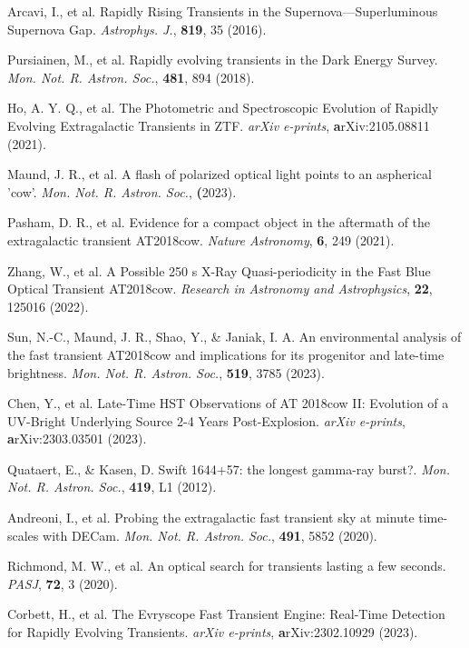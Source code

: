 \documentclass{nature_plusfigure}
\newcommand{\mn}{{Mon. Not. R. Astron. Soc.}}
\newcommand{\mnras}{\mn}
\newcommand{\apj}{{Astrophys. J.}}
\newcommand{\pasj}{{PASJ}}
\begin{document}
\begin{thebibliography}{100}
 Arcavi, I., et al. Rapidly Rising Transients in the Supernova—Superluminous Supernova Gap. \emph{\apj}, \textbf{819}, 35 (2016). 

 Pursiainen, M., et al. Rapidly evolving transients in the Dark Energy Survey. \emph{\mnras}, \textbf{481}, 894 (2018). 

 Ho, A. Y. Q., et al. The Photometric and Spectroscopic Evolution of Rapidly Evolving Extragalactic Transients in ZTF. \emph{arXiv e-prints}, \textbf arXiv:2105.08811 (2021). 

 Maund, J. R., et al. A flash of polarized optical light points to an aspherical 'cow'. \emph{\mnras}, \textbf (2023). 

 Pasham, D. R., et al. Evidence for a compact object in the aftermath of the extragalactic transient AT2018cow. \emph{Nature Astronomy}, \textbf{6}, 249 (2021). 

 Zhang, W., et al. A Possible 250 s X-Ray Quasi-periodicity in the Fast Blue Optical Transient AT2018cow. \emph{Research in Astronomy and Astrophysics}, \textbf{22}, 125016 (2022). 

 Sun, N.-C., Maund, J. R., Shao, Y., \& Janiak, I. A. An environmental analysis of the fast transient AT2018cow and implications for its progenitor and late-time brightness. \emph{\mnras}, \textbf{519}, 3785 (2023). 

 Chen, Y., et al. Late-Time HST Observations of AT 2018cow II: Evolution of a UV-Bright Underlying Source 2-4 Years Post-Explosion. \emph{arXiv e-prints}, \textbf arXiv:2303.03501 (2023). 


 Quataert, E., \& Kasen, D. Swift 1644+57: the longest gamma-ray burst?. \emph{\mnras}, \textbf{419}, L1 (2012). 


 Andreoni, I., et al. Probing the extragalactic fast transient sky at minute time-scales with DECam. \emph{\mnras}, \textbf{491}, 5852 (2020). 

 Richmond, M. W., et al. An optical search for transients lasting a few seconds. \emph{\pasj}, \textbf{72}, 3 (2020). 

 Corbett, H., et al. The Evryscope Fast Transient Engine: Real-Time Detection for Rapidly Evolving Transients. \emph{arXiv e-prints}, \textbf arXiv:2302.10929 (2023). 


\end{thebibliography}
\end{document}
